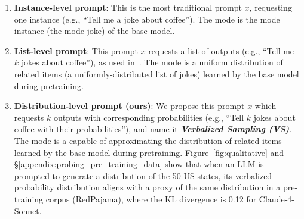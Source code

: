 \begin{enumerate}[nolistsep, leftmargin=*]
\item \textbf{Instance-level prompt}: This is the most traditional prompt $x$, requesting one instance (e.g., ``Tell me a joke about coffee''). The mode is the mode instance (the mode joke) of the base model. %
    \item \textbf{List-level prompt}: This prompt $x$ requests a list of outputs (e.g., ``Tell me $k$ jokes about coffee''), as used in~\cite{wang2023self, dubois2023alpacafarm}. The mode is a uniform distribution of related items (a uniformly-distributed list of jokes) learned by the base model during pretraining.    
    \item \textbf{Distribution-level prompt (ours)}: We propose this prompt $x$ which requests $k$ outputs with corresponding probabilities (e.g., ``Tell $k$ jokes about coffee with their probabilities''), and name it \textbf{\textit{Verbalized Sampling (VS)}}. The mode is a  capable of approximating
    the distribution of related items learned by the base model during pretraining. 
    Figure~\ref{fig:qualitative} and \S\ref{appendix:probing_pre_training_data} show that when an LLM is prompted to generate a distribution of the 50 US states, its verbalized probability distribution aligns with a proxy of the same distribution in a pre-training corpus (RedPajama), where the KL divergence is 0.12 for Claude-4-Sonnet. %
\end{enumerate}

